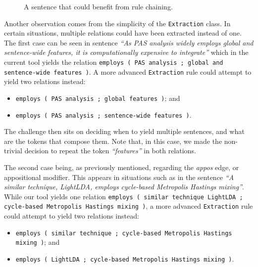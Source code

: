 \documentclass[11pt,a4paper,openright]{memoir}
\begin{document}
\begin{figure}[!htbp]

\centering
{}

\caption[A sentence that could benefit from rule chaining.]{A sentence that could benefit from rule chaining.}
\label{fig:chaining_example}
\end{figure}

Another observation comes from the simplicity of the \texttt{Extraction} class. In certain situations, multiple relations could have been extracted instead of one. The first case can be seen in sentence \emph{\enquote{As PAS analysis widely employs global and sentence-wide features, it is computationally expensive to integrate}} which in the current tool yields the relation \texttt{employs	( PAS analysis ; global and sentence-wide features )}. A more advanced \texttt{Extraction} rule could attempt to yield two relations instead:
\begin{itemize}
	\item \texttt{employs	( PAS analysis ; global features )}; and
	\item \texttt{employs	( PAS analysis ; sentence-wide features )}.
\end{itemize}

The challenge then sits on deciding when to yield multiple sentences, and what are the tokens that compose them. Note that, in this case, we made the non-trivial decision to repeat the token \emph{\enquote{features}} in both relations.

The second case being, as previously mentioned, regarding the \emph{appos} edge, or appositional modifier. This appears in situations such as in the sentence \emph{\enquote{A similar technique, LightLDA, employs cycle-based Metropolis Hastings mixing}}. While our tool yields one relation \texttt{employs	( similar technique LightLDA ; cycle-based Metropolis Hastings mixing )}, a more advanced \texttt{Extraction} rule could attempt to yield two relations instead:
\begin{itemize}
	\item \texttt{employs	( similar technique ; cycle-based Metropolis Hastings mixing )}; and
	\item \texttt{employs	( LightLDA ; cycle-based Metropolis Hastings mixing )}.
\end{itemize}
\end{document}
